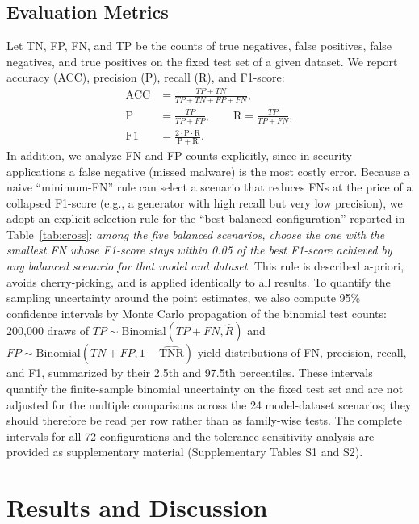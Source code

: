 ﻿\documentclass[journal]{IEEEtran}
\begin{document}
\subsection{Evaluation Metrics}
Let TN, FP, FN, and TP be the counts of true negatives, false positives, false negatives, and true positives on the fixed test set of a given dataset. We report accuracy (ACC), precision (P), recall (R), and F1-score:
\begin{align}
\mathrm{ACC} &= \frac{TP+TN}{TP+TN+FP+FN}, \label{eq:acc}\\
\mathrm{P} &= \frac{TP}{TP+FP}, \qquad \mathrm{R} = \frac{TP}{TP+FN}, \label{eq:pr}\\
\mathrm{F1} &= \frac{2\cdot \mathrm{P}\cdot \mathrm{R}}{\mathrm{P}+\mathrm{R}}. \label{eq:f1}
\end{align}
In addition, we analyze FN and FP counts explicitly, since in security applications a false negative (missed malware) is the most costly error. Because a naive ``minimum-FN'' rule can select a scenario that reduces FNs at the price of a collapsed F1-score (e.g., a generator with high recall but very low precision), we adopt an explicit selection rule for the ``best balanced configuration'' reported in Table~\ref{tab:cross}: \emph{among the five balanced scenarios, choose the one with the smallest FN whose F1-score stays within 0.05 of the best F1-score achieved by any balanced scenario for that model and dataset}. This rule is described a-priori, avoids cherry-picking, and is applied identically to all results. To quantify the sampling uncertainty around the point estimates, we also compute 95\% confidence intervals by Monte Carlo propagation of the binomial test counts: 200{,}000 draws of $TP\sim\mathrm{Binomial}(TP+FN,\hat{R})$ and $FP\sim\mathrm{Binomial}(TN+FP,1-\widehat{\mathrm{TNR}})$ yield distributions of FN, precision, recall, and F1, summarized by their 2.5th and 97.5th percentiles. These intervals quantify the finite-sample binomial uncertainty on the fixed test set and are not adjusted for the multiple comparisons across the 24 model-dataset scenarios; they should therefore be read per row rather than as family-wise tests. The complete intervals for all 72 configurations and the tolerance-sensitivity analysis are provided as supplementary material (Supplementary Tables S1 and S2).

\section{Results and Discussion}
\label{sec:results}
\end{document}
